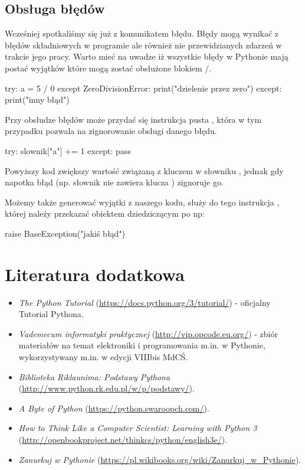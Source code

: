 \documentclass{pdfBooklets}
\begin{document}
\subsection{Obsługa błędów}
Wcześniej spotkaliśmy się już z komunikatem błędu. Błędy mogą wynikać z błędów składniowych w programie ale również nie przewidzianych zdarzeń w trakcie jego pracy.
Warto mieć na uwadze iż wszystkie błędy w Pythonie mają postać wyjątków które mogą zostać obsłużone blokiem /.

\begin{CodeFrame*}[python]{}
try:
  a = 5 / 0
except ZeroDivisionError:
  print("dzielenie przez zero")
except:
  print("inny błąd")
\end{CodeFrame*}

Przy obsłudze błędów może przydać się instrukcja pusta , która w tym przypadku pozwala na zignorowanie obsługi danego błędu.

\begin{CodeFrame*}[python]{}
try:
  slownik["a"] += 1
except:
  pass
\end{CodeFrame*}

Powyższy kod zwiększy wartość związaną z kluczem  w słowniku , jednak gdy napotka błąd (np. słownik nie zawiera klucza ) zignoruje go.

Możemy także generować wyjątki z naszego kodu, służy do tego instrukcja , której należy przekazać obiektem dziedziczącym po  np:

\begin{CodeFrame*}[python]{}
raise BaseException("jakiś błąd")
\end{CodeFrame*}


\student{\clearpage}%
\section{Literatura dodatkowa {\Symbola 🤔}}

\begin{itemize}
\item \emph{The Python Tutorial} (\url{https://docs.python.org/3/tutorial/}) - oficjalny Tutorial Pythona.
\item \emph{Vademecum informatyki praktycznej} (\url{http://vip.opcode.eu.org/}) - zbiór materiałów na temat elektroniki i programowania m.in. w Pythonie, wykorzystywany m.in. w edycji VIIIbis MdCŚ.
\item \emph{Biblioteka Riklaunima: Podstawy Pythona} (\url{http://www.python.rk.edu.pl/w/p/podstawy/}).
\item \emph{A Byte of Python} (\url{https://python.swaroopch.com/}).
\item \emph{How to Think Like a Computer Scientist: Learning with Python 3} (\url{http://openbookproject.net/thinkcs/python/english3e/}).
\item \emph{Zanurkuj w Pythonie} (\url{https://pl.wikibooks.org/wiki/Zanurkuj_w_Pythonie}).
\end{itemize}
\end{document}
